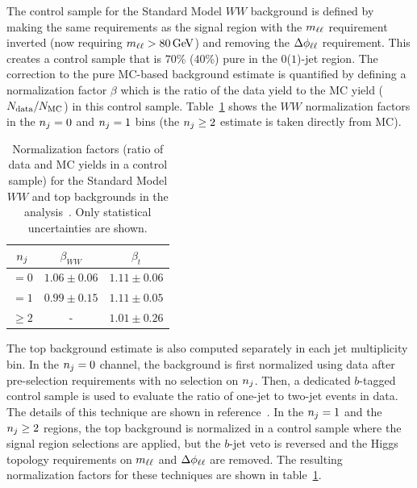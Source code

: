 The control sample for the Standard Model $WW$ background is defined by making the same requirements as the signal region with the $m_{\ell\ell}$ requirement inverted (now requiring $\mll > 80 \GeV$) and removing the $\Delta\phi_{\ell\ell}$ requirement. This creates a control sample that is $70$\% ($40$\%) pure in the $0$($1$)-jet region. The correction to the pure MC-based background estimate is quantified by defining a normalization factor $\beta$ which is the ratio of the data yield to the MC yield ($N_{\rm data}/N_{\rm MC}$) in this control sample. Table~\ref{tab:disc_NF} shows the $WW$ normalization factors in the $n_j = 0$ and $n_j = 1$ bins (the $n_j \geq 2$ estimate is taken directly from MC). 

\begin{table}[h!]
\centering
\captionsetup{justification=centering}

\hspace{-10pt}
\begin{tabular}{|c|c|c|}
\hline
$n_j$ & $\beta_{WW}$ & $\beta_{t}$ \\ \hline
$ = 0$ & $1.06 \pm 0.06$ & $1.11 \pm 0.06$ \\ \hline
$= 1$ & $0.99 \pm 0.15$ & $1.11 \pm 0.05$  \\ \hline
$\geq 2$ & - & $1.01 \pm 0.26$ \\ \hline
\end{tabular}

\caption{
Normalization factors (ratio of data and MC yields in a control sample) for the Standard Model $WW$ and top backgrounds in the \HWWfull analysis~\cite{Discovery}. Only statistical uncertainties are shown. 
}
\label{tab:disc_NF}
\end{table}

The top background estimate is also computed separately in each jet multiplicity bin. In the $n_j = 0$ channel, the background is first normalized using data after pre-selection requirements with no selection on $n_j$. Then, a dedicated $b$-tagged control sample is used to evaluate the ratio of one-jet to two-jet events in data. The details of this technique are shown in reference~\cite{Higgs2011}. In the $n_j = 1$ and the $n_j \geq 2$ regions, the top background is normalized in a control sample where the signal region selections are applied, but the $b$-jet veto is reversed and the Higgs topology requirements on $m_{\ell\ell}$ and $\Delta\phi_{\ell\ell}$ are removed. The resulting normalization factors for these techniques are shown in table~\ref{tab:disc_NF}. 

